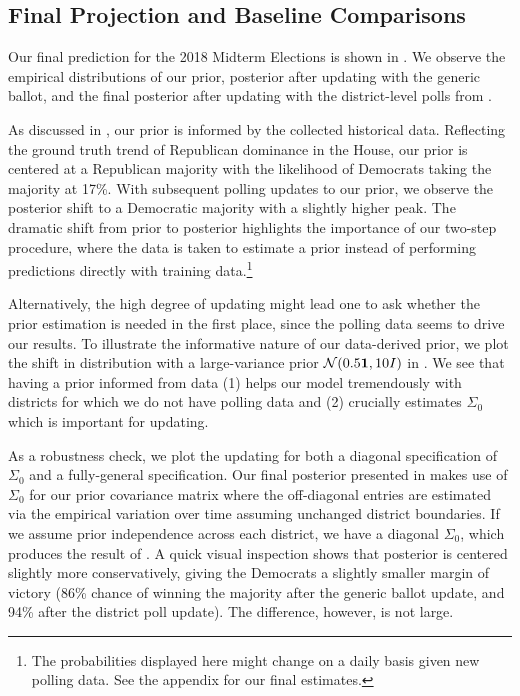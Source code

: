 \documentclass[12pt, letterpaper]{article}
\begin{document}
\subsection{Final Projection and Baseline Comparisons}
Our final prediction for the 2018 Midterm Elections is shown in . We observe the empirical distributions of our prior, posterior after updating with the generic ballot, and the final posterior after updating with the district-level polls from . 

As discussed in , our prior is informed by the collected historical data. Reflecting the ground truth trend of Republican dominance in the House, our prior is centered at a Republican majority with the likelihood of Democrats taking the majority at 17\%. With subsequent polling updates to our prior, we observe the posterior shift to a Democratic majority with a slightly higher peak. The dramatic shift from prior to posterior highlights the importance of our two-step procedure, where the data is taken to estimate a prior instead of performing predictions directly with training data.\footnote{The probabilities displayed here might change on a daily basis given new polling data. See the appendix for our final estimates.}

Alternatively, the high degree of updating might lead one to ask whether the prior estimation is needed in the first place, since the polling data seems to drive our results. To illustrate the informative nature of our data-derived prior, we plot the shift in distribution with a large-variance prior $\mathcal{N}(0.5\bm{1}, 10I)$ in . We see that having a prior informed from data (1) helps our model tremendously with districts for which we do not have polling data and (2) crucially estimates $\Sigma_0$ which is important for updating.

As a robustness check, we plot the updating for both a diagonal specification of $\Sigma_0$ and a fully-general specification. Our final posterior presented in  makes use of $\Sigma_0$ for our prior covariance matrix where the off-diagonal entries are estimated via the empirical variation over time assuming unchanged district boundaries. If we assume prior independence across each district, we have a diagonal $\Sigma_0$, which produces the result of . A quick visual inspection shows that posterior is centered slightly more conservatively, giving the Democrats a slightly smaller margin of victory (86\% chance of winning the majority after the generic ballot update, and 94\% after the district poll update). The difference, however, is not large. 
\end{document}
